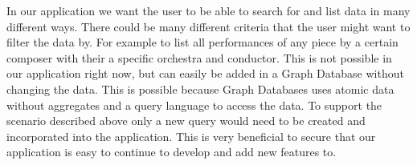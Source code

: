 In our application we want the user to be able to search for and list data in many different ways.
There could be many different criteria that the user might want to filter the data by. For example
to list all performances of any piece by a certain composer with their a specific orchestra and
conductor. This is not possible in our application right now, but can easily be added in a Graph
Database without changing the data. This is possible because Graph Databases uses atomic data
without aggregates and a query language to access the data. To support the scenario described above
only a new query would need to be created and incorporated into the application. This is very
beneficial to secure that our application is easy to continue to develop and add new features to.
